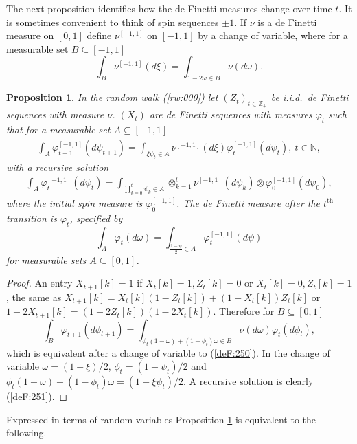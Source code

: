 \documentclass[preprint,11pt]{elsarticle}
\newtheorem{Proposition}{Proposition}
\theoremstyle{remark}
\def\spin{{[-1,1]}}
\def\iid{\emph{i.i.d.}~}
\begin{document}
{The next proposition identifies how the de Finetti measures change over time $t$. It is sometimes convenient to think of spin sequences $\pm 1$. If $\nu$ is a de Finetti measure on $[0,1]$ define $\nu^\spin$ on $[-1,1]$ by a change of variable,
 where for a measurable set $B \subseteq [-1,1]$
 \begin{equation*}
 \int_B\nu^\spin(d\xi) = \int_{1-2\omega \in B}\nu(d\omega).
 \label{shift:123}
 \end{equation*}
\begin{Proposition}\label{propdefmeasures:00}
In the random walk (\ref{rw:000}) let $(Z_t)_{t \in \mathbb{Z}_+}$ be \iid  de Finetti sequences with measure $\nu$.
$(X_t)$ are de Finetti sequences with measures $\varphi_t$ such that for a measurable set $A \subseteq [-1,1]$
\begin{align}
\int_A\varphi^\spin_{t+1}(d\psi_{t+1}) 
= \int_{\xi\psi_t \in A}\nu^\spin(d\xi)\varphi_t^\spin(d\psi_t),\ t \in \mathbb{N},
\label{deF:250}
\end{align}
with a recursive solution
\begin{align}
\int_A\varphi^\spin_{t}(d\psi_{t}) 
= \int_{\prod_{k=0}^t \psi_k \in A}\otimes_{k=1}^t\nu^\spin(d\psi_k)
\otimes\varphi^\spin_0(d\psi_0),
\label{deF:251}
\end{align}
where the initial spin measure is $\varphi^\spin_0$.
The de Finetti measure after the $t^{\text{th}}$ transition is $\varphi_t$, specified by 
\[
\int_A\varphi_t(d\omega) = \int_{\frac{1-\psi}{2} \in A}\varphi_t^\spin(d\psi)
\]
for measurable sets $A \subseteq [0,1]$.
\end{Proposition}
\begin{proof}
An entry $X_{t+1}[k] = 1$ if $X_t[k]=1, Z_t[k]=0$ or $X_t[k]=0, Z_t[k]=1$,
the same as $X_{t+1}[k] = X_t[k](1-Z_t[k]) + (1- X_t[k])Z_t[k]$ or $1-2X_{t+1}[k]=(1-2Z_t[k])(1-2X_t[k])$.
Therefore for $B\subseteq [0,1]$
\begin{equation*}
\int_B\varphi_{t+1}(d\phi_{t+1}) 
= \int_{\phi_t(1-\omega) + (1-\phi_t)\omega \in B}\nu(d\omega)\varphi_t(d\phi_t),
\label{spinback:00}
\end{equation*}
which is equivalent after a change of variable to (\ref{deF:250}). In the change of variable
$\omega = (1-\xi)/2$, $\phi_t = (1 - \psi_t)/2$ and 
$\phi_t(1-\omega) + (1-\phi_t)\omega = (1-\xi\psi_t)/2$.
A recursive solution is clearly (\ref{deF:251}). 
\end{proof}
%
Expressed in terms of random variables Proposition \ref{propdefmeasures:00} is equivalent to the following.
}
\end{document}

